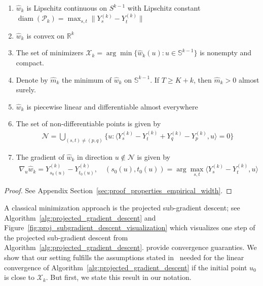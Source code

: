 \begin{Prop}\label{prop:properties_empirical_width}
    \begin{enumerate}
        \item[1.] $\hat{w}_k$ is Lipschitz continuous on $S^{k-1}$ with Lipschitz constant $\operatorname{diam}(\mathcal{P}_k)=\max_{s,t}\|Y_s^{(k)}-Y_t^{(k)}\|$
        \item[2.] $\hat{w}_k$ is convex on $\mathbb{R}^{k}$
        \item[3.] The set of minimizers $\mathcal{X}_k=\arg\min\{\hat{w}_k(u):u\in\mathbb{S}^{k-1}\}$ is nonempty and compact.
        \item[4.] Denote by $\hat{m}_k$ the minimum of $\hat{w}_k$ on $\mathbb{S}^{k-1}$. If $T\ge K+k$, then $\hat{m}_k>0$ almost surely.
        \item[5.] $\hat{w}_k$ is piecewise linear and differentiable almost everywhere
        \item[6.] The set of non-differentiable points is given by
        \begin{align*}
            \mathcal{N}=\bigcup_{(s,t)\ne(p,q)}\{u:\langle Y_s^{(k)}-Y_{t}^{(k)}+Y_q^{(k)}-Y_p^{(k)},u\rangle=0\}
        \end{align*}
        \item[7.] The gradient of $\hat{w}_k$ in direction $u\notin\mathcal{N}$ is given by
        \begin{align*}
            \nabla_u\hat{w}_k=Y_{s_0(u)}^{(k)}-Y_{t_0(u)}^{(k)},\quad(s_0(u),t_0(u))=\arg\max_{s,t}\langle Y_s^{(k)}-Y_t^{(k)},u\rangle
        \end{align*}
    \end{enumerate}
\end{Prop}

\begin{proof}
    See Appendix Section~\ref{sec:proof_properties_empirical_width}.
\end{proof}

A classical minimization approach is the projected sub-gradient descent; see Algorithm~\ref{alg:projected_gradient_descent} and Figure~\ref{fig:proj_subgradient_descent_visualization} which visualizes one step of the projected sub-gradient descent from Algorithm~\ref{alg:projected_gradient_descent}. \cite{li2021weaklyconvexoptimizationstiefel} provide convergence guaranties. We show that our setting fulfills the assumptions stated in~\cite[Theorem 4]{li2021weaklyconvexoptimizationstiefel} needed for the linear convergence of Algorithm~\ref{alg:projected_gradient_descent} if the initial point $u_0$ is close to $\mathcal{X}_k$. But first, we state this result in our notation.

